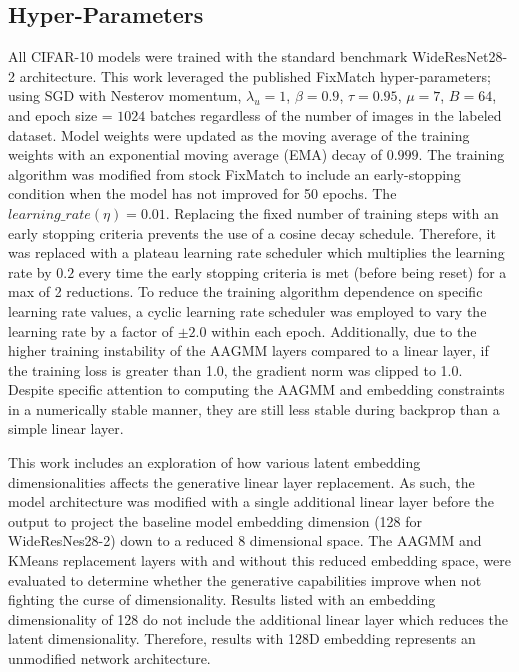 \documentclass[10pt,twocolumn,letterpaper]{article}
\begin{document}
\subsection{Hyper-Parameters}
\label{hyperparams}

All CIFAR-10 models were trained with the standard benchmark WideResNet28-2 architecture.
This work leveraged the published FixMatch \cite{sohn2020fixmatch} hyper-parameters; using SGD with Nesterov momentum,  $\lambda_u = 1$, $\beta = 0.9$, $\tau = 0.95$, $\mu = 7$, $B = 64$, and epoch size = $1024$ batches regardless of the number of images in the labeled dataset.
Model weights were updated as the moving average of the training weights with an exponential moving average (EMA) decay of $0.999$.
The training algorithm was modified from stock FixMatch to include an early-stopping condition when the model has not improved for 50 epochs.
The $learning\_rate (\eta) = 0.01$.
Replacing the fixed number of training steps with an early stopping criteria prevents the use of a cosine decay schedule.
Therefore, it was replaced with a plateau learning rate scheduler which multiplies the learning rate by $0.2$ every time the early stopping criteria is met (before being reset) for a max of 2 reductions.
To reduce the training algorithm dependence on specific learning rate values, a cyclic learning rate scheduler was employed to vary the learning rate by a factor of $\pm2.0$ within each epoch.
Additionally, due to the higher training instability of the AAGMM layers compared to a linear layer, if the training loss is greater than 1.0, the gradient norm was clipped to 1.0.
Despite specific attention to computing the AAGMM and embedding constraints in a numerically stable manner, they are still less stable during backprop than a simple linear layer.

This work includes an exploration of how various latent embedding dimensionalities affects the generative linear layer replacement.
As such, the model architecture was modified with a single additional linear layer before the output to project the baseline model embedding dimension (128 for WideResNes28-2) down to a reduced 8 dimensional space.
The AAGMM and KMeans replacement layers with and without this reduced embedding space, were evaluated to determine whether the generative capabilities improve when not fighting the curse of dimensionality.
Results listed with an embedding dimensionality of 128 do not include the additional linear layer which reduces the latent dimensionality. 
Therefore, results with 128D embedding represents an unmodified network architecture.
\end{document}
